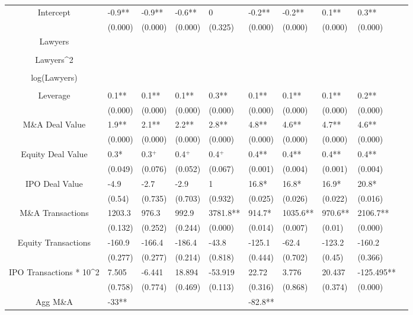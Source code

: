 \documentclass{article}
\begin{document}
\begin{table}[H]
\begin{tabular}{|clllllllll|}
Intercept & -0.9** & -0.9** & -0.6** & 0 & -0.2** & -0.2** & 0.1** & 0.3** & \\ 
   & (0.000) & (0.000) & (0.000) & (0.325) & (0.000) & (0.000) & (0.000) & (0.000) & \\ 
  Lawyers &  &  &  &  &  &  &  &  & \\ 
   &  &  &  &  &  &  &  &  & \\ 
  Lawyers^2 &  &  &  &  &  &  &  &  & \\ 
   &  &  &  &  &  &  &  &  & \\ 
  log(Lawyers) &  &  &  &  &  &  &  &  & \\ 
   &  &  &  &  &  &  &  &  & \\ 
  Leverage & 0.1** & 0.1** & 0.1** & 0.3** & 0.1** & 0.1** & 0.1** & 0.2** & \\ 
   & (0.000) & (0.000) & (0.000) & (0.000) & (0.000) & (0.000) & (0.000) & (0.000) & \\ 
  M\&A Deal Value & 1.9** & 2.1** & 2.2** & 2.8** & 4.8** & 4.6** & 4.7** & 4.6** & \\ 
   & (0.000) & (0.000) & (0.000) & (0.000) & (0.000) & (0.000) & (0.000) & (0.000) & \\ 
  Equity Deal Value & 0.3* & 0.3$^{+}$ & 0.4$^{+}$ & 0.4$^{+}$ & 0.4** & 0.4** & 0.4** & 0.4** & \\ 
   & (0.049) & (0.076) & (0.052) & (0.067) & (0.001) & (0.004) & (0.001) & (0.004) & \\ 
  IPO Deal Value & -4.9 & -2.7 & -2.9 & 1 & 16.8* & 16.8* & 16.9* & 20.8* & \\ 
   & (0.54) & (0.735) & (0.703) & (0.932) & (0.025) & (0.026) & (0.022) & (0.016) & \\ 
  M\&A Transactions & 1203.3 & 976.3 & 992.9 & 3781.8** & 914.7* & 1035.6** & 970.6** & 2106.7** & \\ 
   & (0.132) & (0.252) & (0.244) & (0.000) & (0.014) & (0.007) & (0.01) & (0.000) & \\ 
  Equity Transactions & -160.9 & -166.4 & -186.4 & -43.8 & -125.1 & -62.4 & -123.2 & -160.2 & \\ 
   & (0.277) & (0.277) & (0.214) & (0.818) & (0.444) & (0.702) & (0.45) & (0.366) & \\ 
  IPO Transactions * 10^2 & 7.505 & -6.441 & 18.894 & -53.919 & 22.72 & 3.776 & 20.437 & -125.495** & \\ 
   & (0.758) & (0.774) & (0.469) & (0.113) & (0.316) & (0.868) & (0.374) & (0.000) & \\ 
  Agg M\&A & -33** &  &  &  & -82.8** &  &  &  & \\ 

\end{tabular}
\end{table}
\end{document}
